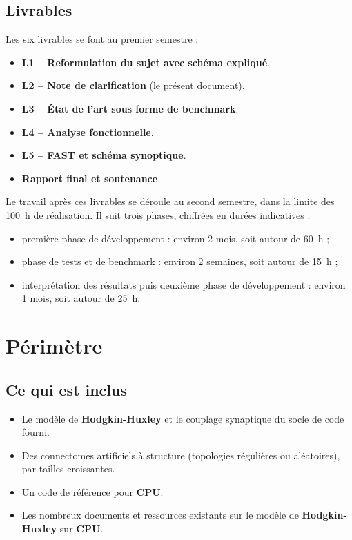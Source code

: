 \documentclass{report}
\begin{document}
\section{Livrables}

Les six livrables se font au premier semestre :

\begin{itemize}
    \item \textbf{L1 -- Reformulation du sujet avec schéma expliqué}.
    \item \textbf{L2 -- Note de clarification} (le présent document).
    \item \textbf{L3 -- État de l'art sous forme de benchmark}.
    \item \textbf{L4 -- Analyse fonctionnelle}.
    \item \textbf{L5 -- FAST et schéma synoptique}.
    \item \textbf{Rapport final et soutenance}.
\end{itemize}

Le travail après ces livrables se déroule au second semestre, dans la limite des 100~h de réalisation. Il suit trois phases, chiffrées en durées indicatives :

\begin{itemize}
    \item première phase de développement : environ 2 mois, soit autour de 60~h ;

    \item phase de tests et de benchmark : environ 2 semaines, soit autour de 15~h ;

    \item interprétation des résultats puis deuxième phase de développement : environ 1 mois, soit autour de 25~h.
\end{itemize}

\chapter{Périmètre}

\section{Ce qui est inclus}

\begin{itemize}
    \item Le modèle de \textbf{Hodgkin-Huxley} et le couplage synaptique du socle de code fourni.
    \item Des connectomes artificiels à structure (topologies régulières ou aléatoires), par tailles croissantes.
    \item Un code de référence pour \textbf{CPU}.
    \item Les nombreux documents et ressources existants sur le modèle de \textbf{Hodgkin-Huxley} sur \textbf{CPU}.
\end{itemize}
\end{document}
